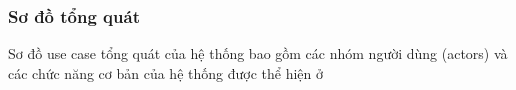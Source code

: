 \subsubsection{Sơ đồ tổng quát}
Sơ đồ use case tổng quát của hệ thống bao gồm các nhóm người dùng (actors) và các chức năng cơ bản của hệ thống được thể hiện ở 

%   
